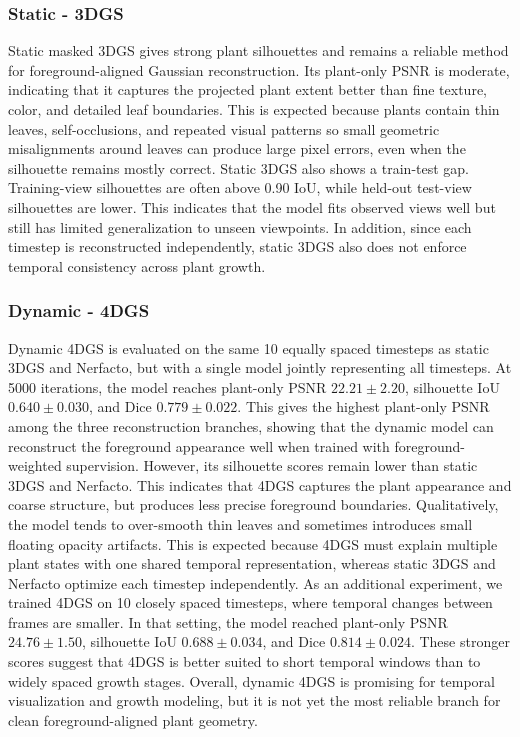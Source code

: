 \documentclass[sigconf]{acmart}
\begin{document}
\subsubsection{Static - 3DGS} Static masked 3DGS gives strong plant silhouettes and remains a reliable method for foreground-aligned Gaussian reconstruction. Its plant-only PSNR is moderate, indicating that it captures the projected plant extent better than fine texture, color, and detailed leaf boundaries. This is expected because plants contain thin leaves, self-occlusions, and repeated visual patterns so small geometric misalignments around leaves can produce large pixel errors, even when the silhouette remains mostly correct. 
Static 3DGS also shows a train-test gap. Training-view silhouettes are often above 0.90 IoU, while held-out test-view silhouettes are lower. This indicates that the model fits observed views well but still has limited generalization to unseen viewpoints. In addition, since each timestep is reconstructed independently, static 3DGS also does not enforce temporal consistency across plant growth.

\subsubsection{Dynamic - 4DGS}
Dynamic 4DGS is evaluated on the same 10 equally spaced timesteps as static 3DGS and Nerfacto, but with a single model jointly representing all timesteps. At 5000 iterations, the model reaches plant-only PSNR $22.21 \pm 2.20$, silhouette IoU $0.640 \pm 0.030$, and Dice $0.779 \pm 0.022$. This gives the highest plant-only PSNR among the three reconstruction branches, showing that the dynamic model can reconstruct the foreground appearance well when trained with foreground-weighted supervision.
However, its silhouette scores remain lower than static 3DGS and Nerfacto. This indicates that 4DGS captures the plant appearance and coarse structure, but produces less precise foreground boundaries. Qualitatively, the model tends to over-smooth thin leaves and sometimes introduces small floating opacity artifacts. This is expected because 4DGS must explain multiple plant states with one shared temporal representation, whereas static 3DGS and Nerfacto optimize each timestep independently.
As an additional experiment, we trained 4DGS on 10 closely spaced timesteps, where temporal changes between frames are smaller. In that setting, the model reached plant-only PSNR $24.76 \pm 1.50$, silhouette IoU $0.688 \pm 0.034$, and Dice $0.814 \pm 0.024$. These stronger scores suggest that 4DGS is better suited to short temporal windows than to widely spaced growth stages. Overall, dynamic 4DGS is promising for temporal visualization and growth modeling, but it is not yet the most reliable branch for clean foreground-aligned plant geometry.
\end{document}

